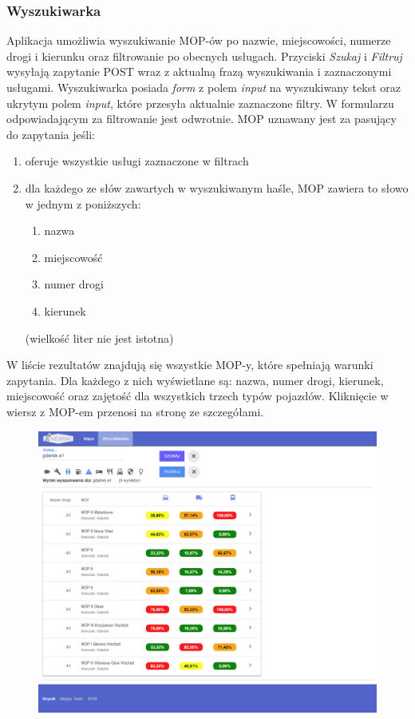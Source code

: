 \subsubsection{Wyszukiwarka}
Aplikacja umożliwia wyszukiwanie MOP-ów po nazwie, miejscowości, numerze drogi i kierunku oraz filtrowanie po obecnych usługach. Przyciski \textit{Szukaj} i \textit{Filtruj} wysyłają zapytanie POST wraz z aktualną frazą wyszukiwania i zaznaczonymi usługami.
Wyszukiwarka posiada \textit{form} z polem \textit{input} na wyszukiwany tekst oraz ukrytym polem \textit{input}, które przesyła aktualnie zaznaczone filtry. W formularzu odpowiadającym za filtrowanie jest odwrotnie.  
MOP uznawany jest za pasujący do zapytania jeśli:
\begin{enumerate}
\item oferuje wszystkie usługi zaznaczone w filtrach
\item dla każdego ze słów zawartych w wyszukiwanym haśle, MOP zawiera to słowo w jednym z poniższych:
\begin{enumerate}
\item nazwa
\item miejscowość
\item numer drogi
\item kierunek
\end{enumerate}
(wielkość liter nie jest istotna)
\end{enumerate}
W liście rezultatów znajdują się wszystkie MOP-y, które spełniają warunki zapytania. Dla każdego z nich wyświetlane są: nazwa, numer drogi, kierunek, miejscowość oraz zajętość dla wszystkich trzech typów pojazdów. Kliknięcie w wiersz z MOP-em przenosi na stronę ze szczegółami.

\begin{figure}[!htb]
\centering
\includegraphics[width=\textwidth]{images/mopsik_www/search.png}
\label{mopsik_www_search}
\end{figure}

